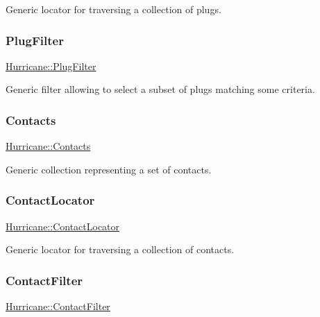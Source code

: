 Generic locator for traversing a collection of plugs. \mbox{\label{namespaceHurricane_ad6b0bd4bdff4c52e6163b9f54e3e5c92}} 
\subsubsection{\texorpdfstring{Plug\+Filter}{PlugFilter}}
{\footnotesize\ttfamily \hyperlink{namespaceHurricane_ad6b0bd4bdff4c52e6163b9f54e3e5c92}{Hurricane\+::\+Plug\+Filter}}

Generic filter allowing to select a subset of plugs matching some criteria. \mbox{\label{namespaceHurricane_a1e6a8ab09f688509bd727b3fee02d0d2}} 
\subsubsection{\texorpdfstring{Contacts}{Contacts}}
{\footnotesize\ttfamily \hyperlink{namespaceHurricane_a1e6a8ab09f688509bd727b3fee02d0d2}{Hurricane\+::\+Contacts}}

Generic collection representing a set of contacts. \mbox{\label{namespaceHurricane_a244811a7f36de747884f0c1ab1cc1025}} 
\subsubsection{\texorpdfstring{Contact\+Locator}{ContactLocator}}
{\footnotesize\ttfamily \hyperlink{namespaceHurricane_a244811a7f36de747884f0c1ab1cc1025}{Hurricane\+::\+Contact\+Locator}}

Generic locator for traversing a collection of contacts. \mbox{\label{namespaceHurricane_a57f79232601d8739370debec00f89740}} 
\subsubsection{\texorpdfstring{Contact\+Filter}{ContactFilter}}
{\footnotesize\ttfamily \hyperlink{namespaceHurricane_a57f79232601d8739370debec00f89740}{Hurricane\+::\+Contact\+Filter}}

